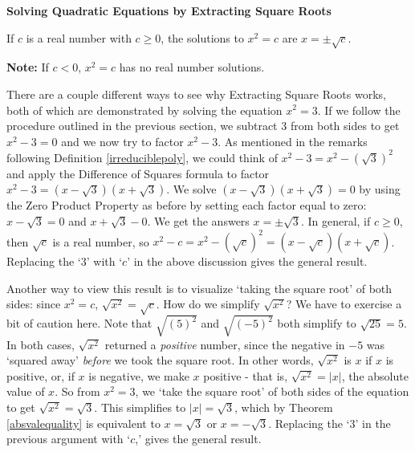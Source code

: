\documentclass{ximera}
\begin{document}

\centerline{\textbf{Solving Quadratic Equations by Extracting Square Roots}}
\vspace{.05in}
If $c$ is a real number with $c \geq 0$, the solutions to $x^2 = c$ are $x = \pm \sqrt{c}$.

\vspace{.05in}
\textbf{Note:}  If $c < 0$, $x^2 = c$ has no real number solutions.


 

There are a couple different ways to see why Extracting Square Roots works, both of which are demonstrated by solving the equation $x^2 = 3$.  If we follow the procedure outlined in the previous section, we subtract $3$ from both sides to get $x^2 - 3 = 0$ and we now try to factor $x^2 - 3$.   As mentioned in the remarks following Definition \ref{irreduciblepoly}, we could think of $x^2 - 3 = x^2 - (\sqrt{3})^2$ and apply the Difference of Squares formula to factor $x^2 - 3 = (x-\sqrt{3})(x+\sqrt{3})$.  We solve $(x-\sqrt{3})(x+\sqrt{3}) = 0$ by using the Zero Product Property as before by setting each factor equal to zero:  $x - \sqrt{3} = 0$ and $x+\sqrt{3} - 0$.  We get the answers $x = \pm \sqrt{3}$.  In general,  if $c \geq 0$, then $\sqrt{c}$ is a real number, so  $x^2 - c = x^2 - (\sqrt{c})^2 = (x-\sqrt{c})(x+\sqrt{c})$.  Replacing the `$3$' with `$c$' in the above discussion gives the general result. 

\smallskip

Another way to view this result is to visualize  `taking the square root' of both sides:   since $x^2 = c$,  $\sqrt{x^2} = \sqrt{c}$.  How do we simplify $\sqrt{x^2}$? We have to exercise a bit of caution here.  Note that $\sqrt{(5)^2}$ and $\sqrt{(-5)^2}$ both simplify to  $\sqrt{25} = 5$.  In both cases, $\sqrt{x^2}$ returned a \textit{positive} number, since the negative in $-5$ was `squared away' \textit{before} we took the square root.  In other words, $\sqrt{x^2}$ is $x$ if $x$ is positive, or, if $x$ is negative, we make $x$ positive - that is, $\sqrt{x^2} = |x|$, the absolute value of $x$.  So from $x^2 = 3$, we `take the square root' of both sides of the equation to get $\sqrt{x^2} = \sqrt{3}$.  This simplifies to $|x| = \sqrt{3}$, which by Theorem \ref{absvalequality} is equivalent to $x = \sqrt{3}$ or $x = -\sqrt{3}$.  Replacing the `$3$' in the previous argument with `$c$,' gives the general result.

\smallskip
\end{document}
